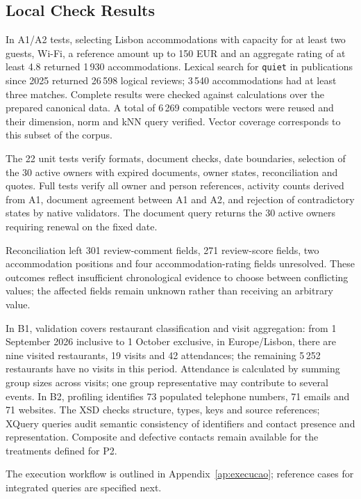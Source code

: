 \subsection{Local Check Results}
In A1/A2 tests, selecting Lisbon accommodations with capacity for at least two guests, Wi-Fi, a reference amount up to 150 EUR and an aggregate rating of at least 4.8 returned 1\,930 accommodations. Lexical search for \texttt{quiet} in publications since 2025 returned 26\,598 logical reviews; 3\,540 accommodations had at least three matches. Complete results were checked against calculations over the prepared canonical data. A total of 6\,269 compatible vectors were reused and their dimension, norm and kNN query verified. Vector coverage corresponds to this subset of the corpus.

The 22 unit tests verify formats, document checks, date boundaries, selection of the 30 active owners with expired documents, owner states, reconciliation and quotes. Full tests verify all owner and person references, activity counts derived from A1, document agreement between A1 and A2, and rejection of contradictory states by native validators. The document query returns the 30 active owners requiring renewal on the fixed date.

Reconciliation left 301 review-comment fields, 271 review-score fields, two accommodation positions and four accommodation-rating fields unresolved. These outcomes reflect insufficient chronological evidence to choose between conflicting values; the affected fields remain unknown rather than receiving an arbitrary value.

In B1, validation covers restaurant classification and visit aggregation: from 1 September 2026 inclusive to 1 October exclusive, in Europe/Lisbon, there are nine visited restaurants, 19 visits and 42 attendances; the remaining 5\,252 restaurants have no visits in this period. Attendance is calculated by summing group sizes across visits; one group representative may contribute to several events. In B2, profiling identifies 73 populated telephone numbers, 71 emails and 71 websites. The XSD checks structure, types, keys and source references; XQuery queries audit semantic consistency of identifiers and contact presence and representation. Composite and defective contacts remain available for the treatments defined for P2.

The execution workflow is outlined in Appendix~\ref{ap:execucao}; reference cases for integrated queries are specified next.
